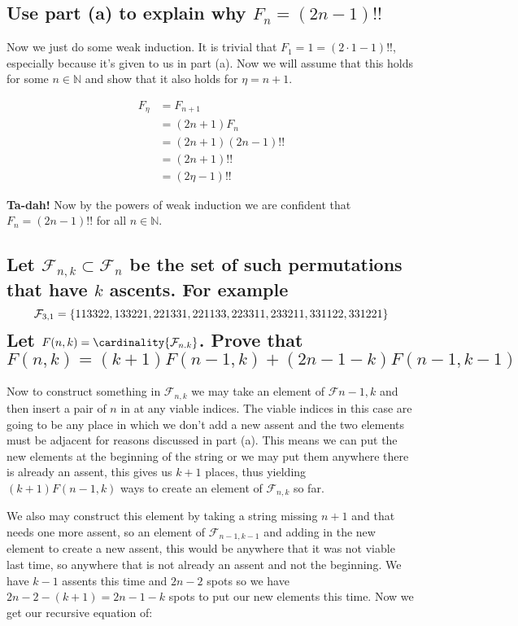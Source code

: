 \documentclass{article}
\theoremstyle{definition}
\begin{document}
	\subsection{Use part (a) to explain why $F_n = (2n-1)!!$}
	
	Now we just do some weak induction. It is trivial that $F_1 = 1 = (2\cdot 1 -1)!!$, especially because it's given to us in part (a). Now we will assume that this holds for some $n \in\mathbb N$ and show that it also holds for $\eta = n+1$.
	
	\begin{align*}
		F_\eta &= F_{n+1} \\
		&= (2n+1)F_n \\
		&= (2n+1)(2n-1)!! \\
		&= (2n+1)!! \\
		&= (2\eta-1)!!
	\end{align*}
	
	\textbf{Ta-dah!} Now by the powers of weak induction we are confident that $F_n = (2n-1)!!$ for all $n\in\mathbb N$.
	
	\subsection{Let $\mathcal F_{n,k} \subset \mathcal F_n$ be the set of such permutations that have $k$ ascents. For example $$\mathcal F_{3,1} = \left\{ {113322, 133221, 221331, 221133, 223311, 233211, 331122, 331221} \right\}$$ Let $F(n,k) = \cardinality{\mathcal F_{n.k}}$. Prove that $$F(n,k) = (k+1)F(n-1,k)+(2n-1-k)F(n-1,k-1)$$}
	
	Now to construct something in $\mathcal F_{n,k}$ we may take an element of $\mathcal F{n-1,k}$ and then insert a pair of $n$ in at any viable indices. The viable indices in this case are going to be any place in which we don't add a new assent and the two elements must be adjacent for reasons discussed in part (a). This means we can put the new elements at the beginning of the string or we may put them anywhere there is already an assent, this gives us $k+1$ places, thus yielding $(k+1)F(n-1,k)$ ways to create an element of $\mathcal F_{n,k}$ so far.
	
	We also may construct this element by taking a string missing $n+1$ and that needs one more assent, so an element of $\mathcal F_{n-1,k-1}$ and adding in the new element to create a new assent, this would be anywhere that it was not viable last time, so anywhere that is not already an assent and not the beginning. We have $k-1$ assents this time and $2n-2$ spots so we have $2n-2-(k+1) = 2n-1-k$ spots to put our new elements this time. Now we get our recursive equation of: 
	
\end{document}
